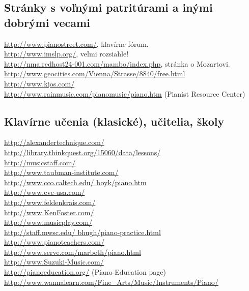 \subsection*{Stránky s voľnými patritúrami a inými dobrými vecami}
\href{http://www.pianostreet.com/}{http://www.pianostreet.com/}, klavírne fórum.\\
\href{http://www.imslp.org/}{http://www.imslp.org/}, veľmi rozsiahle!\\
\href{http://nma.redhost24-001.com/mambo/index.php}{http://nma.redhost24-001.com/mambo/index.php}, stránka o Mozartovi.\\
\href{http://www.geocities.com/Vienna/Strasse/8840/free.html}{http://www.geocities.com/Vienna/Strasse/8840/free.html}\\
\href{http://www.kjos.com/}{http://www.kjos.com/}\\
\href{http://www.rainmusic.com/pianomusic/piano.htm}{http://www.rainmusic.com/pianomusic/piano.htm} (Pianist Resource Center)

\subsection*{Klavírne učenia (klasické), učitelia, školy}
\href{http://alexandertechnique.com/}{http://alexandertechnique.com/}\\
\href{http://library.thinkquest.org/15060/data/lessons/}{http://library.thinkquest.org/15060/data/lessons/}\\
\href{http://musicstaff.com/}{http://musicstaff.com/}\\
\href{http://www.taubman-institute.com/}{http://www.taubman-institute.com/}\\
\href{http://www.cco.caltech.edu/ boyk/piano.htm}{http://www.cco.caltech.edu/ boyk/piano.htm}\\
\href{http://www.cvc-usa.com/}{http://www.cvc-usa.com/}\\
\href{http://www.feldenkrais.com/}{http://www.feldenkrais.com/}\\
\href{http://www.KenFoster.com/}{http://www.KenFoster.com/}\\
\href{http://www.musicplay.com/}{http://www.musicplay.com/}\\
\href{http://staff.mwsc.edu/ bhugh/piano-practice.html}{http://staff.mwsc.edu/ bhugh/piano-practice.html}\\
\href{http://www.pianoteachers.com/}{http://www.pianoteachers.com/}\\
\href{http://www.serve.com/marbeth/piano.html}{http://www.serve.com/marbeth/piano.html}\\
\href{http://www.Suzuki-Music.com/}{http://www.Suzuki-Music.com/}\\
\href{http://pianoeducation.org/}{http://pianoeducation.org/} (Piano Education page)\\ \href{http://www.wannalearn.com/Fine\_Arts/Music/Instruments/Piano/}{http://www.wannalearn.com/Fine\_Arts/Music/Instruments/Piano/}

